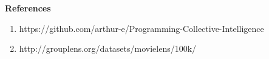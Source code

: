 \documentclass{article}
\begin{document}
\newpage
\textbf{References}
\begin{enumerate}
\item\textbf{} https://github.com/arthur-e/Programming-Collective-Intelligence
\item\textbf{} http://grouplens.org/datasets/movielens/100k/
\end{enumerate}
\end{document}
